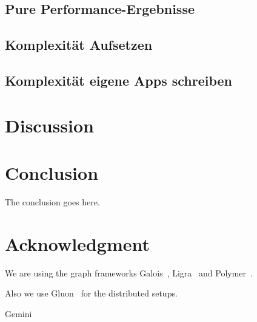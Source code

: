 \documentclass[conference,a4paper]{IEEEtran}
\begin{document}
\subsection{Pure Performance-Ergebnisse}


\subsection{Komplexität Aufsetzen}

\subsection{Komplexität eigene Apps schreiben}


\section{Discussion}




\section{Conclusion}
The conclusion goes here.



\section*{Acknowledgment}
We are using the graph frameworks Galois~\cite{Galois}, Ligra~\cite{Ligra} and Polymer~\cite{Polymer}.

Also we use Gluon~\cite{vertGalois} for the distributed setups.




Gemini~\cite{Gemini}




\end{document}
